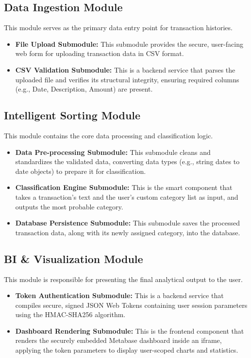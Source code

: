 \subsection{Data Ingestion Module}
This module serves as the primary data entry point for transaction histories.
\begin{itemize}
	\item \textbf{File Upload Submodule:} This submodule provides the secure, user-facing web form for uploading transaction data in CSV format.
	\item \textbf{CSV Validation Submodule:} This is a backend service that parses the uploaded file and verifies its structural integrity, ensuring required columns (e.g., Date, Description, Amount) are present.
\end{itemize}

\subsection{Intelligent Sorting Module}
This module contains the core data processing and classification logic.
\begin{itemize}
	\item \textbf{Data Pre-processing Submodule:} This submodule cleans and standardizes the validated data, converting data types (e.g., string dates to date objects) to prepare it for classification.
	\item \textbf{Classification Engine Submodule:} This is the smart component that takes a transaction's text and the user's custom category list as input, and outputs the most probable category.
	\item \textbf{Database Persistence Submodule:} This submodule saves the processed transaction data, along with its newly assigned category, into the database.
\end{itemize}

\subsection{BI \& Visualization Module}
This module is responsible for presenting the final analytical output to the user.
\begin{itemize}
	\item \textbf{Token Authentication Submodule:} This is a backend service that compiles secure, signed JSON Web Tokens containing user session parameters using the HMAC-SHA256 algorithm.
	\item \textbf{Dashboard Rendering Submodule:} This is the frontend component that renders the securely embedded Metabase dashboard inside an iframe, applying the token parameters to display user-scoped charts and statistics.
\end{itemize}

